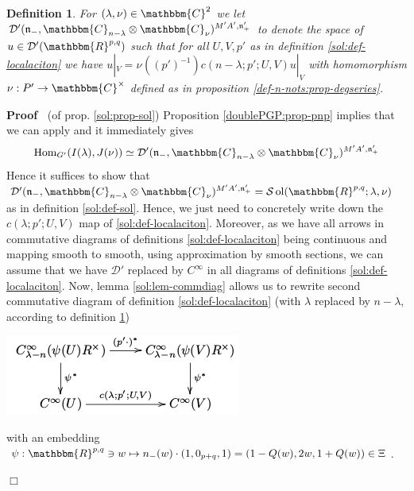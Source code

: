 \documentclass{article}
\newcommand{\tmop}[1]{\ensuremath{\operatorname{#1}}}
\newenvironment{proof}{\noindent\textbf{Proof\ }}{\hspace*{\fill}$\Box$\medskip}
\newtheorem{definition}{Definition}
\numberwithin{definition}{section}
\numberwithin{lemma}{section}
\numberwithin{proposition}{section}
{\theorembodyfont{\rmfamily}\newtheorem{remark}{Remark}
\numberwithin{remark}{section}
}
\begin{document}
\begin{definition}
  \label{sol:def-D'n}For $( \lambda, \nu) \in \mathbbm{C}^2$ we let
  $\mathcal{D}' ( \mathfrak{n}_-, \mathbbm{C}_{n - \lambda} \otimes
  \mathbbm{C}_{\nu})^{M' A', \mathfrak{n}'_+}$ to denote the space of $u \in
  \mathcal{D}' ( \mathbbm{R}^{p, q})$ such that for all $U, V, p'$ as in
  definition \ref{sol:def-localaciton} we have $u |_V = \nu^{} ( ( p')^{- 1})
  c ( n - \lambda ; p' ; U, V) u |_V$ with homomorphism $\nu : P' \rightarrow
  \mathbbm{C}^{\times}$ defined as in proposition
  \ref{def-n-nots:prop-degseries}.
\end{definition}

\begin{proof}
  (of prop. \ref{sol:prop-sol}) Proposition \ref{doublePGP:prop-pnp} implies
  that we can apply {\cite[thm. 3.16]{kobayashi2015symmetry}} and it
  immediately gives
  \[ \tmop{Hom}_{G'} ( I ( \lambda), J ( \nu)) \simeq \mathcal{D}' (
     \mathfrak{n}_-, \mathbbm{C}_{n - \lambda} \otimes \mathbbm{C}_{\nu})^{M'
     A', \mathfrak{n}'_+} \]
  Hence it suffices to show that $\mathcal{D}' ( \mathfrak{n}_-,
  \mathbbm{C}_{n - \lambda} \otimes \mathbbm{C}_{\nu})^{M' A',
  \mathfrak{n}'_+} =\mathcal{S} \tmop{ol} ( \mathbbm{R}^{p, q} ; \lambda,
  \nu)$ as in definition \ref{sol:def-sol}. Hence, we just need to concretely
  write down the $c ( \lambda ; p' ; U, V)$ map of \ref{sol:def-localaciton}.
  Moreover, as we have all arrows in commutative diagrams of definitions
  \ref{sol:def-localaciton} being continuous and mapping smooth to smooth,
  using approximation by smooth sections, we can assume that we have
  $\mathcal{D}'$ replaced by $C^{\infty}$ in all diagrams of definitions
  \ref{sol:def-localaciton}. Now, lemma \ref{sol:lem-commdiag} allows us to
  rewrite second commutative diagram of definition \ref{sol:def-localaciton}
  (with $\lambda$ replaced by $n - \lambda$, according to definition
  \ref{sol:def-D'n})
  
  \begin{center}
    \includegraphics[scale=0.6]{master_master-9.png}
  \end{center}
  
  with an embedding $\psi : \mathbbm{R}^{p, q} \ni w \mapsto n_- ( w) \cdot (
  1, 0_{p + q}, 1) = ( 1 - Q ( w), 2 w, 1 + Q ( w)) \in \Xi$.
  

\end{proof}
\end{document}
